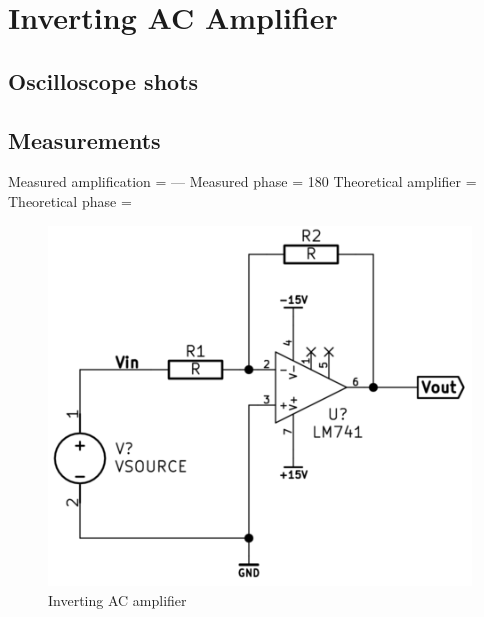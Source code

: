 \documentclass[]{article}
\begin{document}

\section{Inverting AC Amplifier}\label{inverting-ac-amplifier}

\subsection{Oscilloscope shots}\label{oscilloscope-shots}

\subsection{Measurements}\label{measurements-1}

Measured amplification = --- Measured phase = 180 Theoretical amplifier
=\\Theoretical phase =

\begin{figure}[htbp]
\centering
\includegraphics{img/invACamp.png}
\caption{Inverting AC amplifier}
\end{figure}


\end{document}
